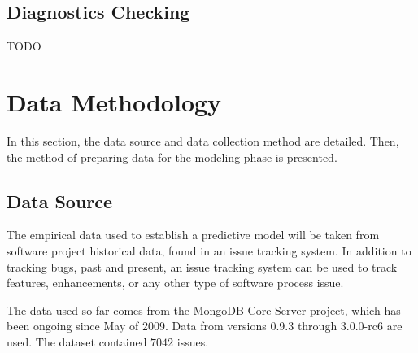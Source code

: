\documentclass[a4paper]{scrartcl}
\begin{document}
\subsection*{Diagnostics Checking}
TODO

%
%
%
%
%

\section*{Data Methodology}
\label{sec:data_methodology}

In this section, the data source and data collection method are detailed. Then, the method of preparing data for the modeling phase is presented.

\subsection*{Data Source}
The empirical data used to establish a predictive model will be taken from software project historical data, found in an issue tracking system. In addition to tracking bugs, past and present, an issue tracking system can be used to track features, enhancements, or any other type of software process issue. 

The data used so far comes from the MongoDB \href{https://jira.mongodb.org/browse/SERVER}{Core Server} project, which has been ongoing since May of 2009. Data from versions 0.9.3 through 3.0.0-rc6 are used. The dataset contained $7042$ issues.
\end{document}
